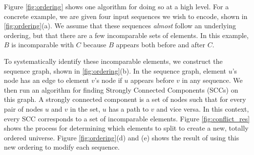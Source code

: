  Figure \ref{fig:ordering} shows one algorithm for doing so at a high level. For a concrete example, we are given four input sequences we wish to encode, shown in \ref{fig:ordering}(a). We assume that these sequences \textit{almost} follow an underlying ordering, but that there are a few incomparable sets of elements. In this example, $B$ is incomparable with $C$ because $B$ appears both before and after $C$. 

To systematically identify these incomparable elements, we construct the sequence graph, shown in \ref{fig:ordering}(b). In the sequence graph, element $u$'s node has an edge to element $v$'s node if $u$ appears before $v$ in any sequence. We then run an algorithm for finding Strongly Connected Components (SCCs) on this graph. A strongly connected component is a set of nodes such that for every pair of nodes $u$ and $v$ in the set, $u$ has a path to $v$ and vice versa. In this context, every SCC corresponds to a set of incomparable elements. Figure \ref{fig:conflict_res} shows the process for determining which elements to split to create a new, totally ordered universe. Figure \ref{fig:ordering}(d) and (e) shows the result of using this new ordering to modify each sequence. 


